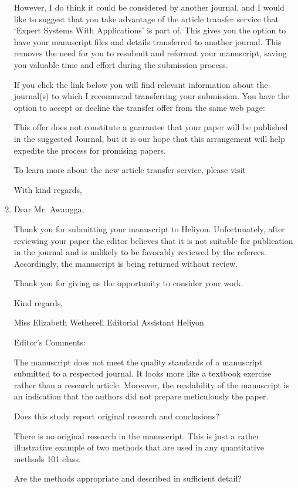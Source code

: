 \begin{enumerate}
	However, I do think it could be considered by another journal, and I would like to suggest that you take advantage of the article transfer service that `Expert Systems With Applications' is part of. This gives you the option to have your manuscript files and details transferred to another journal. This removes the need for you to resubmit and reformat your manuscript, saving you valuable time and effort during the submission process.

	If you click the link below you will find relevant information about the journal(s) to which I recommend transferring your submission. You have the option to accept or decline the transfer offer from the same web page:

	This offer does not constitute a guarantee that your paper will be published in the suggested Journal, but it is our hope that this arrangement will help expedite the process for promising papers.

	To learn more about the new article transfer service, please visit

	With kind regards,
	\item Dear Mr. Awangga,

	Thank you for submitting your manuscript to Heliyon. Unfortunately, after reviewing your paper the editor believes that it is not suitable for publication in the journal and is unlikely to be favorably reviewed by the referees. Accordingly, the manuscript is being returned without review.

	Thank you for giving us the opportunity to consider your work.

	Kind regards,

	Miss Elizabeth Wetherell
	Editorial Assistant
	Heliyon

	Editor's Comments:

	The manuscript does not meet the quality standards of a manuscript submitted to a respected journal. It looks more like a textbook exercise rather than a research article. Moreover, the readability of the manuscript is an indication that the authors did not prepare meticulously the paper. 

	Does this study report original research and conclusions?

	There is no original research in the manuscript. This is just a rather illustrative example of two methods that are used in any quantitative methods 101 class.

	Are the methods appropriate and described in sufficient detail?


\end{enumerate}
